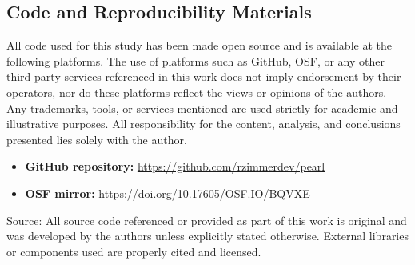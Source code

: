 
\begin{apendicesenv}
    
    \appendix
        
    \chapter{Code and Reproducibility Materials}
    \label{ch:code}

    All code used for this study has been made open source and is available at the following platforms.
    The use of platforms such as GitHub, OSF, or any other third-party services referenced in this work does not imply endorsement
    by their operators, nor do these platforms reflect the views or opinions of the authors.
    Any trademarks, tools, or services mentioned are used strictly for academic and illustrative purposes.
    All responsibility for the content, analysis, and conclusions presented lies solely with the author.

    \begin{itemize}
        \item \textbf{GitHub repository:} \url{https://github.com/rzimmerdev/pearl}
        \item \textbf{OSF mirror:} \url{https://doi.org/10.17605/OSF.IO/BQVXE}
    \end{itemize}
    \begin{flushleft}
        Source: All source code referenced or provided as part of this work is original and 
        was developed by the authors unless explicitly stated otherwise.
        External libraries or components used are properly cited and licensed.
    \end{flushleft}

\end{apendicesenv}
